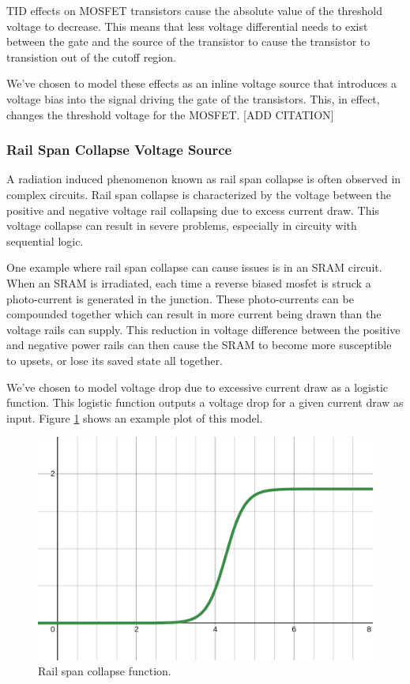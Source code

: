 \documentclass[conference]{IEEEtran}
\begin{document}
    TID effects on MOSFET transistors cause the absolute value of the threshold voltage to decrease. This means that less voltage differential needs to exist between the gate and the source of the transistor to cause the transistor to transistion out of the cutoff region.

    We've chosen to model these effects as an inline voltage source that introduces a voltage bias into the signal driving the gate of the transistors.
    This, in effect, changes the threshold voltage for the MOSFET.
    [ADD CITATION]

    \vspace{1em}

    \subsubsection{Rail Span Collapse Voltage Source}
    A radiation induced phenomenon known as rail span collapse is often observed in complex circuits.
    Rail span collapse is characterized by the voltage between the positive and negative voltage rail collapsing due to excess current draw.
    This voltage collapse can result in severe problems, especially in circuity with sequential logic.

    One example where rail span collapse can cause issues is in an SRAM circuit.
    When an SRAM is irradiated, each time a reverse biased mosfet is struck a photo-current is generated in the junction.
    These photo-currents can be compounded together which can result in more current being drawn than the voltage rails can supply.
    This reduction in voltage difference between the positive and negative power rails can then cause the SRAM to become more susceptible to upsets, or lose its saved state all together.

    We've chosen to model voltage drop due to excessive current draw as a logistic function.
    This logistic function outputs a voltage drop for a given current draw as input.
    Figure \ref{fig:rail_collapse_function} shows an example plot of this model.

    \begin{figure}[htbp]
        \centering
        \includegraphics[width=0.95\linewidth]{rail_collapse_function}
        \caption{Rail span collapse function.}
        \label{fig:rail_collapse_function}
    \end{figure}
\end{document}
